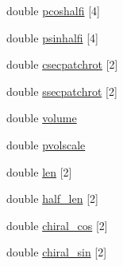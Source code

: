 \begin{DoxyCompactItemize}
double \hyperlink{struct_ia__param_a6836ed2a44748c8b1f71219c01b5a713}{pcoshalfi} \mbox{[}4\mbox{]}
\item 
double \hyperlink{struct_ia__param_a52fcecbb5171074f634ebe68a1037d0d}{psinhalfi} \mbox{[}4\mbox{]}
\item 
double \hyperlink{struct_ia__param_a7f94789a785201573c04d8c5e71dc9fa}{csecpatchrot} \mbox{[}2\mbox{]}
\item 
double \hyperlink{struct_ia__param_a14afc5f0a2e7842923345b3724e329f2}{ssecpatchrot} \mbox{[}2\mbox{]}
\item 
double \hyperlink{struct_ia__param_af19168047d88497117c70ff6672df1bf}{volume}
\item 
double \hyperlink{struct_ia__param_ae90674c64fb9e8d68e964114bb029709}{pvolscale}
\item 
double \hyperlink{struct_ia__param_a50f385d02c6d6c4dabec2c27f552b358}{len} \mbox{[}2\mbox{]}
\item 
double \hyperlink{struct_ia__param_a2cccc1246cdc72d8b88a747efdfd4f70}{half\+\_\+len} \mbox{[}2\mbox{]}
\item 
double \hyperlink{struct_ia__param_aca5d2f928a51400f45ba6d3b1370b586}{chiral\+\_\+cos} \mbox{[}2\mbox{]}
\item 
double \hyperlink{struct_ia__param_a569adcf853f7e6f7ccf0515928249bb6}{chiral\+\_\+sin} \mbox{[}2\mbox{]}
\end{DoxyCompactItemize}


